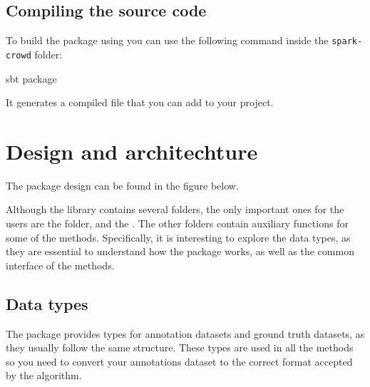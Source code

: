 \documentclass[letterpaper,10pt,english]{sphinxmanual}
\begin{document}
\section{Compiling the source code}
\label{\detokenize{usage/installation:compiling-the-source-code}}
To build the package using  you can use the following command inside the \texttt{spark-crowd} folder:

%
\begin{sphinxVerbatim}[commandchars=\\\{\}]
sbt package
\end{sphinxVerbatim}

It generates a compiled  file that you can add to your project.


\chapter{Design and architechture}
\label{\detokenize{package/design:design-and-architechture}}\label{\detokenize{package/design::doc}}
The package design can be found in the figure below.

\noindent{}

Although the library contains several folders, the only important ones for the users
are the  folder, and the . The other folders contain auxiliary
functions for some of the methods. Specifically, it is interesting to explore the data types, as
they are essential to understand how the package works, as well as the common interface of
the methods.


\section{Data types}
\label{\detokenize{package/design:data-types}}
The package provides types for annotation datasets and ground truth datasets, as they usually follow
the same structure. These types are used in all the methods so you need to convert
your annotations dataset to the correct format accepted by the algorithm.
\end{document}
